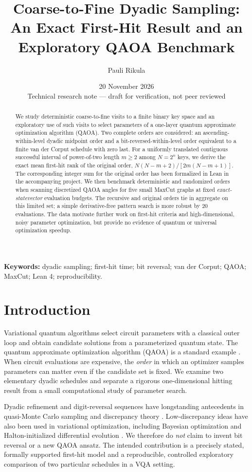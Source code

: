 \documentclass[10pt,a4paper]{article}
\title{\bfseries Coarse-to-Fine Dyadic Sampling:\\An Exact First-Hit Result and an Exploratory QAOA Benchmark}
\author{Pauli Rikula}
\date{20 November 2026\\[3pt]\small Technical research note --- draft for verification, not peer reviewed}
\begin{document}
\maketitle
\vspace{-7mm}
\begin{abstract}
We study deterministic coarse-to-fine visits to a finite binary key space and an exploratory use of such visits to select parameters of a one-layer quantum approximate optimization algorithm (QAOA). Two complete orders are considered: an ascending-within-level dyadic midpoint order and a bit-reversed-within-level order equivalent to a finite van der Corput schedule with zero last. For a uniformly translated contiguous successful interval of power-of-two length $m\ge2$ among $N=2^n$ keys, we derive the exact mean first-hit rank of the original order, $N(N-m+2)/[2m(N-m+1)]$. The corresponding integer sum for the original order has been formalized in Lean in the accompanying project. We then benchmark deterministic and randomized orders when scanning discretized QAOA angles for five small MaxCut graphs at fixed \emph{exact-statevector} evaluation budgets. The recursive and original orders tie in aggregate on this limited set; a simple derivative-free pattern search is more robust by 20 evaluations. The data motivate further work on first-hit criteria and high-dimensional, noisy parameter optimization, but provide no evidence of quantum or universal optimization speedup.
\end{abstract}
\textbf{Keywords:} dyadic sampling; first-hit time; bit reversal; van der Corput; QAOA; MaxCut; Lean 4; reproducibility.

\section{Introduction}
Variational quantum algorithms select circuit parameters with a classical outer loop and obtain candidate solutions from a parameterized quantum state. The quantum approximate optimization algorithm (QAOA) is a standard example \cite{farhi2014}. When circuit evaluations are expensive, the \emph{order} in which an optimizer samples parameters can matter even if the candidate set is fixed. We examine two elementary dyadic schedules and separate a rigorous one-dimensional hitting result from a small computational study of parameter search.

Dyadic refinement and digit-reversal sequences have longstanding antecedents in quasi-Monte Carlo sampling and discrepancy theory \cite{matousek1999}. Low-discrepancy ideas have also been used in variational optimization, including Bayesian optimization \cite{iannelli2021} and Halton-initialized differential evolution \cite{failde2023}. We therefore do \emph{not} claim to invent bit reversal or a new QAOA ansatz. The intended contribution is a precisely stated, formally supported first-hit model and a reproducible, controlled exploratory comparison of two particular schedules in a VQA setting.
\end{document}

